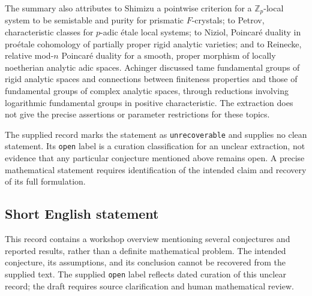\documentclass[11pt]{article}
\begin{document}
The summary also attributes to Shimizu a pointwise criterion for a \(\mathbb Z_p\)-local system to be semistable and purity for prismatic \(F\)-crystals; to Petrov, characteristic classes for \(p\)-adic étale local systems; to Niziol, Poincaré duality in proétale cohomology of partially proper rigid analytic varieties; and to Reinecke, relative mod-\(n\) Poincaré duality for a smooth, proper morphism of locally noetherian analytic adic spaces. Achinger discussed tame fundamental groups of rigid analytic spaces and connections between finiteness properties and those of fundamental groups of complex analytic spaces, through reductions involving logarithmic fundamental groups in positive characteristic. The extraction does not give the precise assertions or parameter restrictions for these topics.

The supplied record marks the statement as \texttt{unrecoverable} and supplies no clean statement. Its \texttt{open} label is a curation classification for an unclear extraction, not evidence that any particular conjecture mentioned above remains open. A precise mathematical statement requires identification of the intended claim and recovery of its full formulation.
\subsection{Short English statement}
This record contains a workshop overview mentioning several conjectures and reported results, rather than a definite mathematical problem. The intended conjecture, its assumptions, and its conclusion cannot be recovered from the supplied text. The supplied \texttt{open} label reflects dated curation of this unclear record; the draft requires source clarification and human mathematical review.
\end{document}
